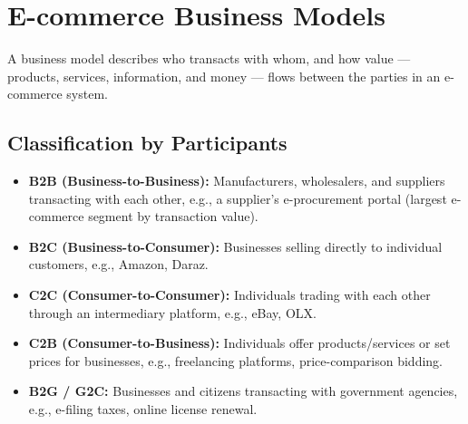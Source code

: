 \documentclass[11pt,a4paper]{article}
\begin{document}
\section{E-commerce Business Models}

\begin{definitionbox}
A business model describes who transacts with whom, and how value --- products, services, information, and money --- flows between the parties in an e-commerce system.
\end{definitionbox}

\subsection{Classification by Participants}

\begin{center}
\end{center}

\begin{itemize}[leftmargin=*]
  \item \textbf{B2B (Business-to-Business):} Manufacturers, wholesalers, and suppliers transacting with each other, e.g., a supplier's e-procurement portal (largest e-commerce segment by transaction value).
  \item \textbf{B2C (Business-to-Consumer):} Businesses selling directly to individual customers, e.g., Amazon, Daraz.
  \item \textbf{C2C (Consumer-to-Consumer):} Individuals trading with each other through an intermediary platform, e.g., eBay, OLX.
  \item \textbf{C2B (Consumer-to-Business):} Individuals offer products/services or set prices for businesses, e.g., freelancing platforms, price-comparison bidding.
  \item \textbf{B2G / G2C:} Businesses and citizens transacting with government agencies, e.g., e-filing taxes, online license renewal.
\end{itemize}
\end{document}
